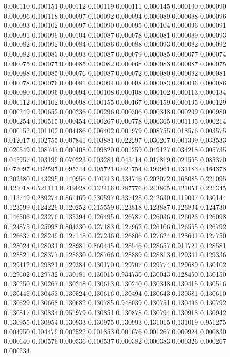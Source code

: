 0.000110
0.000151
0.000112
0.000119
0.000111
0.000145
0.000100
0.000090
0.000096
0.000118
0.000097
0.000092
0.000094
0.000089
0.000088
0.000096
0.000093
0.000102
0.000097
0.000090
0.000095
0.000104
0.000096
0.000091
0.000091
0.000099
0.000104
0.000087
0.000078
0.000081
0.000089
0.000093
0.000082
0.000092
0.000084
0.000086
0.000088
0.000093
0.000082
0.000092
0.000082
0.000083
0.000093
0.000087
0.000079
0.000085
0.000077
0.000074
0.000075
0.000077
0.000085
0.000082
0.000068
0.000083
0.000087
0.000075
0.000088
0.000085
0.000076
0.000087
0.000072
0.000080
0.000082
0.000081
0.000078
0.000076
0.000081
0.000094
0.000098
0.000083
0.000096
0.000086
0.000080
0.000096
0.000094
0.000108
0.000108
0.000102
0.000113
0.000134
0.000112
0.000102
0.000098
0.000155
0.000167
0.000159
0.000195
0.000129
0.000249
0.000652
0.000236
0.000296
0.000306
0.000348
0.000209
0.000980
0.000254
0.000515
0.000454
0.000267
0.000778
0.000365
0.001195
0.000214
0.000152
0.001102
0.004486
0.006402
0.001979
0.008755
0.018576
0.003575
0.012017
0.002755
0.007841
0.003881
0.022297
0.030207
0.001399
0.033533
0.020549
0.008747
0.000408
0.009820
0.001259
0.049127
0.034218
0.005735
0.045957
0.003199
0.070223
0.003281
0.043414
0.017819
0.021565
0.085370
0.072097
0.162597
0.095244
0.105721
0.021754
0.199961
0.131183
0.164378
0.202380
0.143295
0.140956
0.170713
0.334746
0.202072
0.168085
0.221095
0.421018
0.521111
0.219028
0.132416
0.287776
0.243865
0.121054
0.221345
0.113749
0.289274
0.861469
0.330597
0.337128
0.242630
0.119007
0.130144
0.123599
0.124229
0.120252
0.315559
0.123818
0.123887
0.126834
0.124730
0.146506
0.123276
0.135394
0.126495
0.126787
0.126036
0.126023
0.126098
0.124875
0.125998
0.804330
0.127183
0.127962
0.126106
0.126565
0.126792
0.126637
0.128249
0.127148
0.127246
0.126806
0.127624
0.128601
0.127750
0.128024
0.128031
0.128981
0.860445
0.128546
0.128657
0.911721
0.128581
0.128821
0.128377
0.128830
0.128766
0.128889
0.128813
0.129341
0.129336
0.129412
0.129821
0.129384
0.130170
0.129707
0.129774
0.129689
0.130102
0.129602
0.129732
0.130181
0.130015
0.934735
0.130043
0.128460
0.130150
0.130250
0.130267
0.130248
0.130613
0.130240
0.130348
0.130415
0.130516
0.130445
0.130453
0.130524
0.130616
0.130494
0.130643
0.130581
0.130610
0.130629
0.130668
0.130682
0.130785
0.948039
0.130751
0.130493
0.130792
0.130817
0.130834
0.951979
0.130851
0.130878
0.130794
0.130918
0.130942
0.130955
0.130954
0.130933
0.130975
0.130993
0.131015
0.131019
0.951275
0.004950
0.004479
0.002522
0.001853
0.001676
0.001267
0.000924
0.000830
0.000640
0.000576
0.000536
0.000537
0.000382
0.000383
0.000326
0.000267
0.000234

